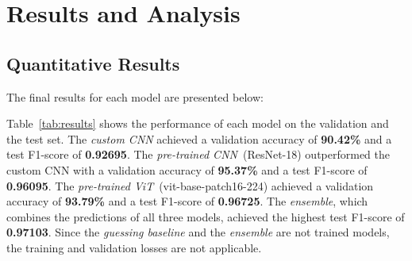\section{Results and Analysis}

\subsection{Quantitative Results}

The final results for each model are presented below:

\begin{table}[htbp]
    \caption{Quantitative results of the models on the train, validation and test set.}
    \begin{center}
    \end{center}
\end{table}

Table~\ref{tab:results} shows the performance of each model on the validation and the test set. The \textit{custom CNN} achieved a validation accuracy of \textbf{90.42\%} and a test F1-score of \textbf{0.92695}. The \textit{pre-trained CNN}~(ResNet-18) outperformed the custom CNN with a validation accuracy of \textbf{95.37\%} and a test F1-score of \textbf{0.96095}. The \textit{pre-trained ViT}~(vit-base-patch16-224) achieved a validation accuracy of \textbf{93.79\%} and a test F1-score of \textbf{0.96725}. The \textit{ensemble}, which combines the predictions of all three models, achieved the highest test F1-score of \textbf{0.97103}. Since the \textit{guessing baseline} and the \textit{ensemble} are not trained models, the training and validation losses are not applicable.

